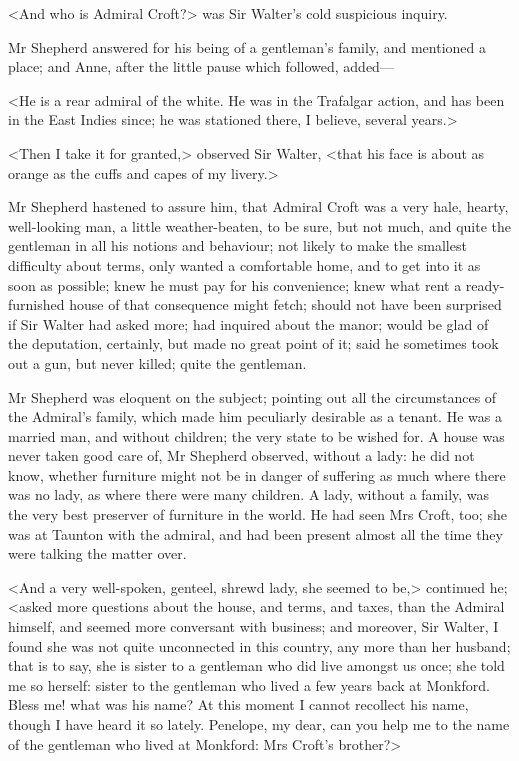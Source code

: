 <And who is Admiral Croft?> was Sir Walter's cold suspicious inquiry.

Mr Shepherd answered for his being of a gentleman's family, and mentioned a place; and Anne, after the little pause which followed, added—

<He is a rear admiral of the white. He was in the Trafalgar action, and has been in the East Indies since; he was stationed there, I believe, several years.>

<Then I take it for granted,> observed Sir Walter, <that his face is about as orange as the cuffs and capes of my livery.>

Mr Shepherd hastened to assure him, that Admiral Croft was a very hale, hearty, well-looking man, a little weather-beaten, to be sure, but not much, and quite the gentleman in all his notions and behaviour; not likely to make the smallest difficulty about terms, only wanted a comfortable home, and to get into it as soon as possible; knew he must pay for his convenience; knew what rent a ready-furnished house of that consequence might fetch; should not have been surprised if Sir Walter had asked more; had inquired about the manor; would be glad of the deputation, certainly, but made no great point of it; said he sometimes took out a gun, but never killed; quite the gentleman.

Mr Shepherd was eloquent on the subject; pointing out all the circumstances of the Admiral's family, which made him peculiarly desirable as a tenant. He was a married man, and without children; the very state to be wished for. A house was never taken good care of, Mr Shepherd observed, without a lady: he did not know, whether furniture might not be in danger of suffering as much where there was no lady, as where there were many children. A lady, without a family, was the very best preserver of furniture in the world. He had seen Mrs Croft, too; she was at Taunton with the admiral, and had been present almost all the time they were talking the matter over.

<And a very well-spoken, genteel, shrewd lady, she seemed to be,> continued he; <asked more questions about the house, and terms, and taxes, than the Admiral himself, and seemed more conversant with business; and moreover, Sir Walter, I found she was not quite unconnected in this country, any more than her husband; that is to say, she is sister to a gentleman who did live amongst us once; she told me so herself: sister to the gentleman who lived a few years back at Monkford. Bless me! what was his name? At this moment I cannot recollect his name, though I have heard it so lately. Penelope, my dear, can you help me to the name of the gentleman who lived at Monkford: Mrs Croft's brother?>

